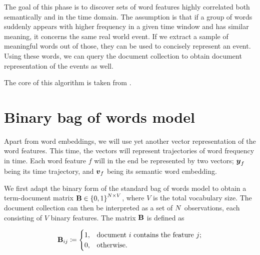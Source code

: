 

\newcommand{\featcount}{V}
\newcommand{\traj}{y}
\newcommand{\embed}{\vect{v}}
\newcommand{\df}{DF}
\newcommand{\featset}{\text{M}}
\newcommand{\cost}{\text{C}}

\newcommand{\semsim}{\text{Sim}}
\newcommand{\featsim}{\text{JSD}}

\newcommand{\bowmat}{\mat{B}}
\newcommand{\dtdmat}{\mat{D}}
\newcommand{\trajmat}{\mat{T}}


The goal of this phase is to discover sets of word features highly correlated both semantically and in the time domain. The assumption is that if a group of words suddenly appears with higher frequency in a given time window and has similar meaning, it concerns the same real world event. If we extract a sample of meaningful words out of those, they can be used to concisely represent an event. Using these words, we can query the document collection to obtain document representation of the events as well.

The core of this algorithm is taken from \cite{event-detection}.


\section{Binary bag of words model}
Apart from word embeddings, we will use yet another vector representation of the word features. This time, the vectors will represent trajectories of word frequency in time. Each word feature $f$ will in the end be represented by two vectors; $\vect{\traj}_{f}$ being its time trajectory, and $\embed_{f}$ being its semantic word embedding.

We first adapt the binary form of the standard bag of words model to obtain a term-document matrix $\bowmat \in \left\{ 0, 1 \right\}^{\doccount \times \featcount}$, where $\featcount$ is the total vocabulary size. The document collection can then be interpreted as a set of $N$ observations, each consisting of $\featcount$ binary features. The matrix $\bowmat$ is defined as

\begin{equation} \label{eq:bow-matrix}
	\bowmat_{ij} \coloneqq
	\begin{cases}
		1, & \text{document}~i~\text{contains the feature}~j \text{;} \\
		0, & \text{otherwise.}
	\end{cases}
\end{equation}


